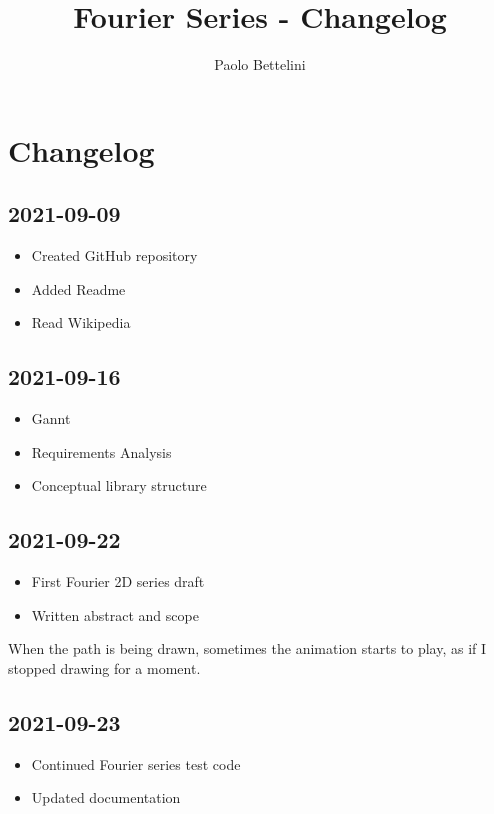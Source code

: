 \documentclass{article}
\title{Fourier Series - Changelog}
\author{Paolo Bettelini}
\date{}
\begin{document}
\maketitle
\tableofcontents
\pagebreak

\section{Changelog}

\subsection*{2021-09-09}

\begin{itemize}
    \item Created GitHub repository
    \item Added Readme
    \item Read Wikipedia
\end{itemize}

\subsection*{2021-09-16}

\begin{itemize}
    \item Gannt
    \item Requirements Analysis
    \item Conceptual library structure
\end{itemize}

\subsection*{2021-09-22}

\begin{itemize}
    \item First Fourier 2D series draft
    \item Written abstract and scope
\end{itemize}

When the path is being drawn, sometimes the animation
starts to play, as if I stopped drawing for a moment.

\subsection*{2021-09-23}

\begin{itemize}
    \item Continued Fourier series test code
    \item Updated documentation
\end{itemize}
\end{document}
